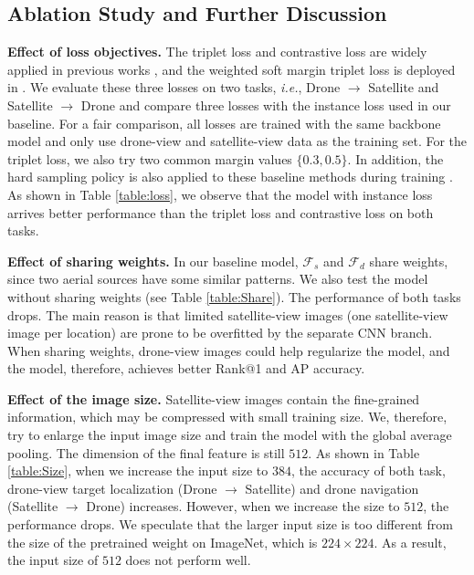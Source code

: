 \documentclass[sigconf]{acmart}
\def\ie{\emph{i.e.}}
\begin{document}
\subsection{Ablation Study and Further Discussion} \label{sec:ablation}
\noindent\textbf{Effect of loss objectives.}
The triplet loss and contrastive loss are widely applied in previous works \cite{lin2015learning,workman2015wide,deng2018triplet,chechik2010large,zheng2016discriminatively}, and the weighted soft margin triplet loss is deployed in \cite{hu2018cvm,liu2019lending,cai2019ground}. We evaluate these three losses on two tasks, \ie, Drone $\rightarrow$ Satellite and Satellite $\rightarrow$ Drone and compare three losses with the instance loss used in our baseline. For a fair comparison, all losses are trained with the same backbone model and only use drone-view and satellite-view data as the training set. For the triplet loss, we also try two common margin values $\{0.3, 0.5\}$. In addition, the hard sampling policy is also applied to these baseline methods during training \cite{hermans2017defense,oh2016deep}. As shown in Table \ref{table:loss}, we observe that the model with instance loss arrives better performance than the triplet loss and contrastive loss on both tasks.

\noindent\textbf{Effect of sharing weights.} In our baseline model, $\mathcal{F}_s$ and $\mathcal{F}_d$ share weights, since two aerial sources have some similar patterns. We also test the model without sharing weights (see Table \ref{table:Share}). The performance of both tasks drops. The main reason is that limited satellite-view images (one satellite-view image per location) are prone to be overfitted by the separate CNN branch. When sharing weights, drone-view images could help regularize the model, and the model, therefore, achieves better Rank@1 and AP accuracy.

\noindent\textbf{Effect of the image size.} Satellite-view images contain the fine-grained information, which may be compressed with small training size. We, therefore, try to enlarge the input image size and train the model with the global average pooling. The dimension of the final feature is still $512$. As shown in Table \ref{table:Size}, when we increase the input size to $384$, the accuracy of both task, drone-view target localization (Drone $\rightarrow$ Satellite) and drone navigation (Satellite $\rightarrow$ Drone) increases. However, when we increase the size to $512$, the performance drops. We speculate that the larger input size is too different from the size of the pretrained weight on ImageNet, which is $224\times224$. As a result, the input size of $512$ does not perform well. 
\end{document}
